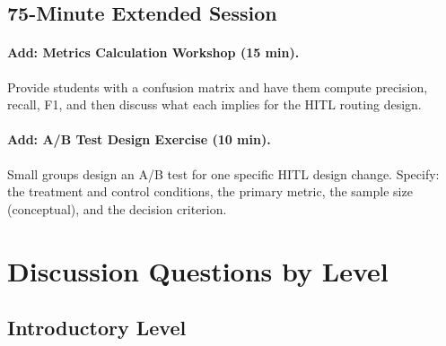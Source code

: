 \subsection{75-Minute Extended Session}

\paragraph{Add: Metrics Calculation Workshop (15 min).}
Provide students with a confusion matrix and have them compute precision, recall, F1, and then discuss what each implies for the HITL routing design.

\paragraph{Add: A/B Test Design Exercise (10 min).}
Small groups design an A/B test for one specific HITL design change. Specify: the treatment and control conditions, the primary metric, the sample size (conceptual), and the decision criterion.

\section{Discussion Questions by Level}

\subsection{Introductory Level}

